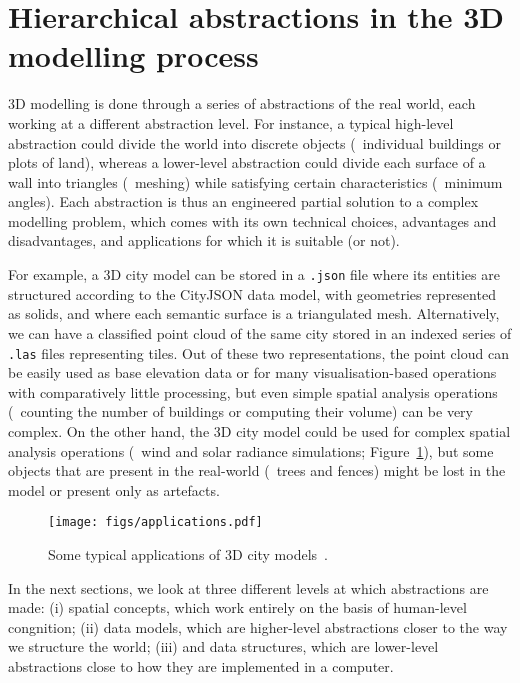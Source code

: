 \section{Hierarchical abstractions in the 3D modelling process}

3D modelling is done through a series of abstractions of the real world, each working at a different abstraction level.
For instance, a typical high-level abstraction could divide the world into discrete objects (\eg\ individual buildings or plots of land), whereas a lower-level abstraction could divide each surface of a wall into triangles (\ie\ meshing) while satisfying certain characteristics (\eg\ minimum angles).
Each abstraction is thus an engineered partial solution to a complex modelling problem, which comes with its own technical choices, advantages and disadvantages, and applications for which it is suitable (or not).

For example, a 3D city model can be stored in a \texttt{.json} file where its entities are structured according to the CityJSON data model, with geometries represented as solids, and where each semantic surface is a triangulated mesh.
Alternatively, we can have a classified point cloud of the same city stored in an indexed series of \texttt{.las} files representing tiles.
Out of these two representations, the point cloud can be easily used as base elevation data or for many visualisation-based operations with comparatively little processing, but even simple spatial analysis operations (\eg\ counting the number of buildings or computing their volume) can be very complex.
On the other hand, the 3D city model could be used for complex spatial analysis operations (\eg\ wind and solar radiance simulations; Figure~\ref{fig:applications}), but some objects that are present in the real-world (\eg\ trees and fences) might be lost in the model or present only as artefacts.

\begin{figure}
\centering
\texttt{[image: figs/applications.pdf]}
\caption{Some typical applications of 3D city models~\citep{Biljecki15a}.}%
\label{fig:applications}
\end{figure}

In the next sections, we look at three different levels at which abstractions are made: (i) spatial concepts, which work entirely on the basis of human-level congnition; (ii) data models, which are higher-level abstractions closer to the way we structure the world; (iii) and data structures, which are lower-level abstractions close to how they are implemented in a computer.

